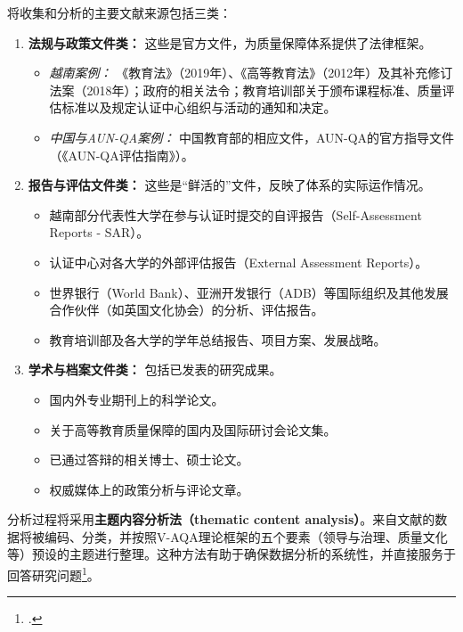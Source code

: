 将收集和分析的主要文献来源包括三类：
\begin{enumerate}
    \item \textbf{法规与政策文件类：} 这些是官方文件，为质量保障体系提供了法律框架。
    \begin{itemize}
        \item \textit{越南案例：} 《教育法》（2019年）、《高等教育法》（2012年）及其补充修订法案（2018年）；政府的相关法令；教育培训部关于颁布课程标准、质量评估标准以及规定认证中心组织与活动的通知和决定。
        \item \textit{中国与AUN-QA案例：} 中国教育部的相应文件，AUN-QA的官方指导文件（《AUN-QA评估指南》）。
    \end{itemize}
    
    \item \textbf{报告与评估文件类：} 这些是“鲜活的”文件，反映了体系的实际运作情况。
    \begin{itemize}
        \item 越南部分代表性大学在参与认证时提交的自评报告（Self-Assessment Reports - SAR）。
        \item 认证中心对各大学的外部评估报告（External Assessment Reports）。
        \item 世界银行（World Bank）、亚洲开发银行（ADB）等国际组织及其他发展合作伙伴（如英国文化协会）的分析、评估报告。
        \item 教育培训部及各大学的学年总结报告、项目方案、发展战略。
    \end{itemize}
    
    \item \textbf{学术与档案文件类：} 包括已发表的研究成果。
    \begin{itemize}
        \item 国内外专业期刊上的科学论文。
        \item 关于高等教育质量保障的国内及国际研讨会论文集。
        \item 已通过答辩的相关博士、硕士论文。
        \item 权威媒体上的政策分析与评论文章。
    \end{itemize}
\end{enumerate}

分析过程将采用\textbf{主题内容分析法（thematic content analysis）}。来自文献的数据将被编码、分类，并按照V-AQA理论框架的五个要素（领导与治理、质量文化等）预设的主题进行整理。这种方法有助于确保数据分析的系统性，并直接服务于回答研究问题\footcite{BraunClarke2006}。

